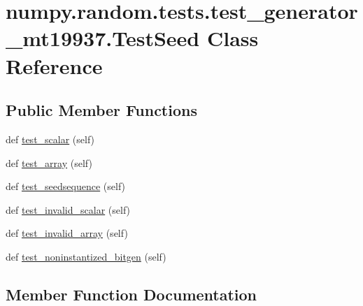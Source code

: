 \hypertarget{classnumpy_1_1random_1_1tests_1_1test__generator__mt19937_1_1TestSeed}{}\section{numpy.\+random.\+tests.\+test\+\_\+generator\+\_\+mt19937.\+Test\+Seed Class Reference}
\label{classnumpy_1_1random_1_1tests_1_1test__generator__mt19937_1_1TestSeed}
\subsection*{Public Member Functions}
\begin{DoxyCompactItemize}
\item 
def \hyperlink{classnumpy_1_1random_1_1tests_1_1test__generator__mt19937_1_1TestSeed_a4f689627186bd2dc4f36ed3947722407}{test\+\_\+scalar} (self)
\item 
def \hyperlink{classnumpy_1_1random_1_1tests_1_1test__generator__mt19937_1_1TestSeed_a379e4b0aa8ec0e629dab93eff7d6b2ce}{test\+\_\+array} (self)
\item 
def \hyperlink{classnumpy_1_1random_1_1tests_1_1test__generator__mt19937_1_1TestSeed_a1d53f94ce11fcb588417d7e2e09883a7}{test\+\_\+seedsequence} (self)
\item 
def \hyperlink{classnumpy_1_1random_1_1tests_1_1test__generator__mt19937_1_1TestSeed_af0d05a9d9ace67fdea3c8240415b43d2}{test\+\_\+invalid\+\_\+scalar} (self)
\item 
def \hyperlink{classnumpy_1_1random_1_1tests_1_1test__generator__mt19937_1_1TestSeed_ad9bf0275b7febb47e3a449ea8f91b19d}{test\+\_\+invalid\+\_\+array} (self)
\item 
def \hyperlink{classnumpy_1_1random_1_1tests_1_1test__generator__mt19937_1_1TestSeed_a13ec5b23a2ac5a881883075aa2104e4c}{test\+\_\+noninstantized\+\_\+bitgen} (self)
\end{DoxyCompactItemize}


\subsection{Member Function Documentation}
\mbox{\label{classnumpy_1_1random_1_1tests_1_1test__generator__mt19937_1_1TestSeed_a379e4b0aa8ec0e629dab93eff7d6b2ce}} 
